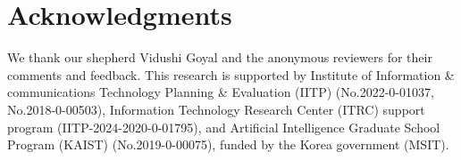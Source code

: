 \section*{Acknowledgments}
We thank our shepherd Vidushi Goyal and the anonymous reviewers for their comments and feedback.
%
This research is supported by Institute of Information \& communications
Technology Planning \& Evaluation (IITP) (No.2022-0-01037, No.2018-0-00503), Information Technology Research Center (ITRC) support program (IITP-2024-2020-0-01795), and Artificial Intelligence Graduate School Program (KAIST) (No.2019-0-00075), funded by the Korea government (MSIT).
